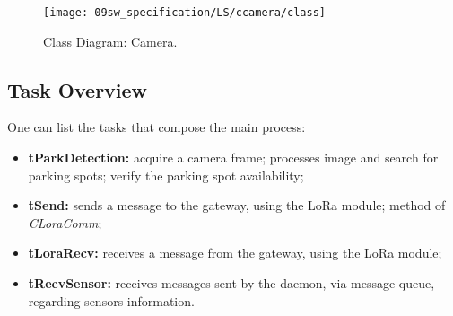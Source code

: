 \begin{figure}[H]
	\centering
	\texttt{[image: 09sw\_specification/LS/ccamera/class]}
	\caption{Class Diagram: Camera.}
	\label{fig:classcamera}
\end{figure}

%
%
%
%
%

\clearpage
\subsection{Task Overview}

One can list the tasks that compose the main process:
\begin{itemize}
	\item \textbf{tParkDetection:} acquire a camera frame; processes image and search for parking spots; verify the parking spot availability;
 	\item \textbf{tSend:} sends a message to the gateway, using the LoRa module; method of \textit{CLoraComm};
	\item \textbf{tLoraRecv:} receives a message from the gateway, using the LoRa module;
	\item \textbf{tRecvSensor:} receives messages sent by the daemon, via message queue, regarding sensors information.
\end{itemize}

